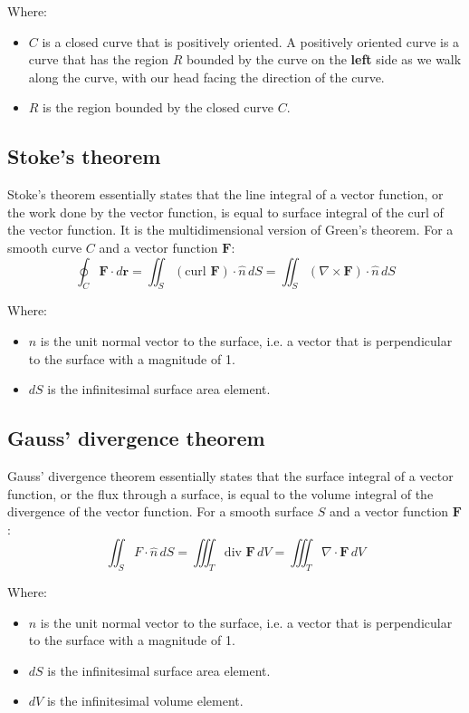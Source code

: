 \documentclass[11pt]{article}
\begin{document}
Where:
\begin{itemize}
\item \(C\) is a closed curve that is positively oriented. A positively oriented curve is a curve that has the region \(R\) bounded by the curve on the \textbf{left} side as we walk along the curve, with our head facing the direction of the curve.
\item \(R\) is the region bounded by the closed curve \(C\).
\end{itemize}
\subsection{Stoke's theorem}
\label{sec:orgd17929d}
Stoke's theorem essentially states that the line integral of a vector function, or the work done by the vector function, is equal to surface integral of the curl of the vector function. It is the multidimensional version of Green's theorem.
For a smooth curve \(C\) and a vector function \(\boldsymbol{F}\):
\[\oint_C \boldsymbol{F} \cdot d \boldsymbol{r} = \iint_S (\text{curl } \boldsymbol{F}) \cdot \hat{n} \, dS = \iint_S (\nabla \times \boldsymbol{F}) \cdot \hat{n} \, dS\]

Where:
\begin{itemize}
\item \(\hat{n}\) is the unit normal vector to the surface, i.e. a vector that is perpendicular to the surface with a magnitude of 1.
\item \(dS\) is the infinitesimal surface area element.
\end{itemize}
\subsection{Gauss' divergence theorem}
\label{sec:orgaff71cd}
Gauss' divergence theorem essentially states that the surface integral of a vector function, or the flux through a surface, is equal to the volume integral of the divergence of the vector function.
For a smooth surface \(S\) and a vector function \(\boldsymbol{F}\):
\[\iint_S F \cdot \hat{n} \, dS = \iiint_T \text{div } \boldsymbol{F} \, dV = \iiint_T \nabla \cdot \boldsymbol{F} \, dV\]

Where:
\begin{itemize}
\item \(\hat{n}\) is the unit normal vector to the surface, i.e. a vector that is perpendicular to the surface with a magnitude of 1.
\item \(dS\) is the infinitesimal surface area element.
\item \(dV\) is the infinitesimal volume element.
\end{itemize}
\end{document}
